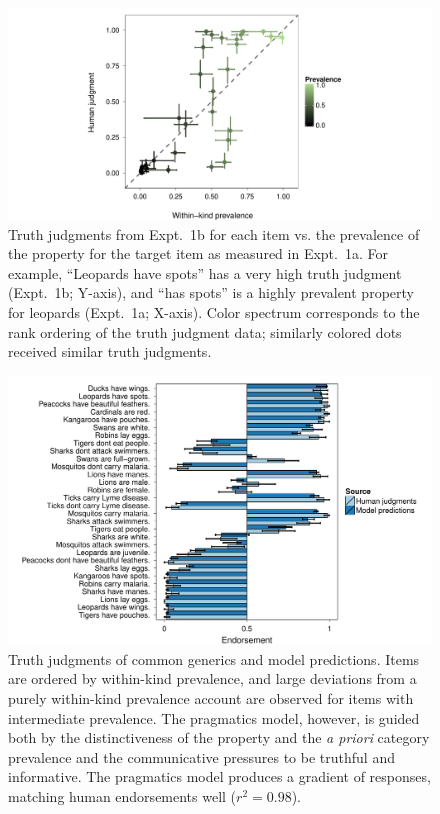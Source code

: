 \documentclass[10pt,letterpaper]{article}
\begin{document}
\begin{figure}
\centering
    \includegraphics[width=\columnwidth]{tj_n100_tjVsPrevalence_95hdi-colorPrev.pdf}
    \caption{Truth judgments from Expt.~1b for each item vs. the prevalence of the property for the target item as measured in Expt.~1a. For example, ``Leopards have spots'' has a very high truth judgment (Expt.~1b; Y-axis), and ``has spots'' is a highly prevalent property for leopards (Expt.~1a; X-axis). Color spectrum corresponds to the rank ordering of the truth judgment data; similarly colored dots received similar truth judgments.}
  \label{fig:scatterprev}
\end{figure}


\begin{figure}
\centering
    \includegraphics[width=\columnwidth]{tj_n100-postPred-byItem.pdf}
    \caption{Truth judgments of common generics and model predictions. 
Items are ordered by within-kind prevalence, and large deviations from a purely within-kind prevalence account are observed for items with intermediate prevalence. 
The pragmatics model, however, is guided both by the distinctiveness of the property and the \emph{a priori} category prevalence and the communicative pressures to be truthful and informative.
The pragmatics model produces a gradient of responses, matching human endorsements well ($r^2 = 0.98$).}
  \label{fig:tj1b}
\end{figure}
\end{document}
